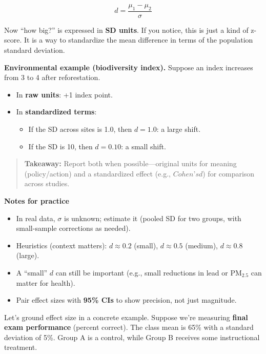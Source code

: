 \documentclass[
  letterpaper,
  DIV=11,
  numbers=noendperiod]{scrreprt}
\providecommand{\tightlist}{%
  \setlength{\itemsep}{0pt}\setlength{\parskip}{0pt}}
\begin{document}
\[
d = \frac{\mu_1 - \mu_2}{\sigma}
\]

Now ``how big?'' is expressed in \textbf{SD units}. If you notice, this
is just a kind of z-score. It is a way to standardize the mean
difference in terms of the population standard deviation.

\textbf{Environmental example (biodiversity index).} Suppose an index
increases from 3 to 4 after reforestation.

\begin{itemize}
\item
  In \textbf{raw units}: +1 index point.
\item
  In \textbf{standardized terms}:

  \begin{itemize}
  \tightlist
  \item
    If the SD across sites is 1.0, then \(d = 1.0\): a large shift.
  \item
    If the SD is 10, then \(d = 0.10\): a small shift.
  \end{itemize}
\end{itemize}

\begin{quote}
\textbf{Takeaway:} Report both when possible---original units for
meaning (policy/action) and a standardized effect (e.g., \(Cohen’s d\))
for comparison across studies.
\end{quote}

\textbf{Notes for practice}

\begin{itemize}
\tightlist
\item
  In real data, \(\sigma\) is unknown; estimate it (pooled SD for two
  groups, with small-sample corrections as needed).
\item
  Heuristics (context matters): \(d \approx 0.2\) (small),
  \(d \approx 0.5\) (medium), \(d \approx 0.8\) (large).
\item
  A ``small'' \(d\) can still be important (e.g., small reductions in
  lead or \(\mathrm{PM}_{2.5}\) can matter for health).
\item
  Pair effect sizes with \textbf{95\% CIs} to show precision, not just
  magnitude.
\end{itemize}

Let's ground effect size in a concrete example. Suppose we're measuring
\textbf{final exam performance} (percent correct). The class mean is
65\% with a standard deviation of 5\%. Group A is a control, while Group
B receives some instructional treatment.
\end{document}
